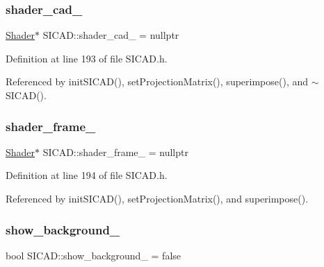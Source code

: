 \subsubsection{\texorpdfstring{shader\+\_\+cad\+\_\+}{shader\_cad\_}}
{\footnotesize\ttfamily \mbox{\hyperlink{classShader}{Shader}}$\ast$ S\+I\+C\+A\+D\+::shader\+\_\+cad\+\_\+ = nullptr\hspace{0.3cm}{\ttfamily [private]}}



Definition at line 193 of file S\+I\+C\+A\+D.\+h.



Referenced by init\+S\+I\+C\+A\+D(), set\+Projection\+Matrix(), superimpose(), and $\sim$\+S\+I\+C\+A\+D().

\mbox{\label{classSICAD_ac921e60623f3797253bcbcdd445b903b}} 
\subsubsection{\texorpdfstring{shader\+\_\+frame\+\_\+}{shader\_frame\_}}
{\footnotesize\ttfamily \mbox{\hyperlink{classShader}{Shader}}$\ast$ S\+I\+C\+A\+D\+::shader\+\_\+frame\+\_\+ = nullptr\hspace{0.3cm}{\ttfamily [private]}}



Definition at line 194 of file S\+I\+C\+A\+D.\+h.



Referenced by init\+S\+I\+C\+A\+D(), set\+Projection\+Matrix(), and superimpose().

\mbox{\label{classSICAD_a8db9e37d71a14883be4879e9ea4b6a02}} 
\subsubsection{\texorpdfstring{show\+\_\+background\+\_\+}{show\_background\_}}
{\footnotesize\ttfamily bool S\+I\+C\+A\+D\+::show\+\_\+background\+\_\+ = false\hspace{0.3cm}{\ttfamily [private]}}



